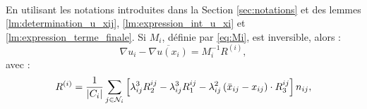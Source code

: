 \documentclass[12pt,a4paper]{article}
\begin{document}
	\begin{lm}$ $\\
		En utilisant les notations introduites dans la Section \ref{sec:notations} et des lemmes \ref{lm:determination_u_xij}, \ref{lm:expression_int_u_xi} et \ref{lm:expression_terme_finale}. Si $M_i$, définie par \eqref{eq:Mi}, est inversible, alors :
		\begin{equation}\label{eq:reformulation_final}
			\nabla u_i - \overline{\nabla u(x_i)} = M_i^{-1}R^{(i)},
		\end{equation}
		avec :
		\begin{equation}\label{eq:R4}
			{ {R^{(i)}}} = \dfrac1{\left\lvert C_i \right\rvert}\sum_{j \in \mathcal N_i} \left[\lambda_{ij}^3R_2^{ij} - \lambda_{ij}^3R_1^{ij} - \lambda_{ij}^2\left( {\bar x_{ij}-x_{ij}}\right)\cdot R_3^{ij}\right]n_{ij},
		\end{equation}
	\end{lm}
\end{document}

